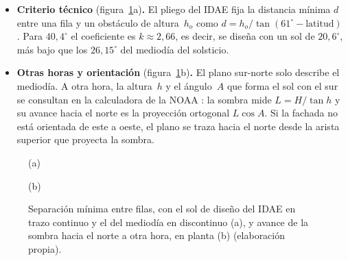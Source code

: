 \begin{itemize}
  \item \textbf{Criterio técnico} (figura~\ref{fig:filashoras}a)\textbf{.} El pliego del IDAE fija la distancia mínima $d$ entre una fila y un obstáculo de altura~$h_o$ como $d = h_o / \tan(61^\circ-\text{latitud})$ \parencite{idae}. Para $40{,}4^\circ$ el coeficiente es $k\approx 2{,}66$, es decir, se diseña con un sol de $20{,}6^\circ$, más bajo que los $26{,}15^\circ$ del mediodía del solsticio.
  \item \textbf{Otras horas y orientación} (figura~\ref{fig:filashoras}b)\textbf{.} El plano sur-norte solo describe el mediodía. A otra hora, la altura~$h$ y el ángulo~$A$ que forma el sol con el sur se consultan en la calculadora de la NOAA \parencite{noaa}: la sombra mide $L=H/\tan h$ y su avance hacia el norte es la proyección ortogonal $L\cos A$. Si la fachada no está orientada de este a oeste, el plano se traza hacia el norte desde la arista superior que proyecta la sombra.
\end{itemize}

\begin{figure}[H]
\centering
\begin{minipage}[b]{0.49\linewidth}\centering
{}
\par\smallskip (a)
\end{minipage}\hfill
\begin{minipage}[b]{0.49\linewidth}\centering
{}
\par\smallskip (b)
\end{minipage}
\caption{Separación mínima entre filas, con el sol de diseño del IDAE en trazo continuo y el del mediodía en discontinuo (a), y avance de la sombra hacia el norte a otra hora, en planta (b) (elaboración propia).}\label{fig:filashoras}
\end{figure}

